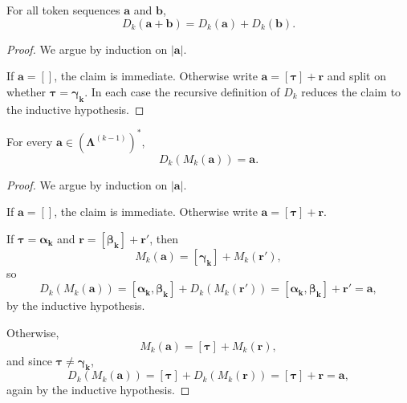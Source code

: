 \begin{lemma}
    \label{lemma:bpe-decompression-append}
    For all token sequences $\mathbf{a}$ and $\mathbf{b}$,
    \[
    D_k(\mathbf{a}+\mathbf{b}) = D_k(\mathbf{a}) + D_k(\mathbf{b}).
    \]
\end{lemma}
\begin{proof}
    We argue by induction on $|\mathbf{a}|$.

    If $\mathbf{a} = []$, the claim is immediate.
    Otherwise write $\mathbf{a} = [\boldsymbol{\tau}] + \mathbf{r}$ and split on whether
    $\boldsymbol{\tau} = \boldsymbol{\gamma_k}$.
    In each case the recursive definition of $D_k$ reduces the claim to the inductive hypothesis.
\end{proof}

\begin{lemma}
    \label{lemma:bpe-decompression-left-inverse}
    For every $\mathbf{a} \in (\boldsymbol{\Lambda}^{(k-1)})^*$,
    \[
    D_k(M_k(\mathbf{a})) = \mathbf{a}.
    \]
\end{lemma}
\begin{proof}
    We argue by induction on $|\mathbf{a}|$.

    If $\mathbf{a} = []$, the claim is immediate.
    Otherwise write $\mathbf{a} = [\boldsymbol{\tau}] + \mathbf{r}$.

    If $\boldsymbol{\tau} = \boldsymbol{\alpha_k}$ and $\mathbf{r} = [\boldsymbol{\beta_k}] + \mathbf{r}'$,
    then
    \[
    M_k(\mathbf{a}) = [\boldsymbol{\gamma_k}] + M_k(\mathbf{r}'),
    \]
    so
    \[
    D_k(M_k(\mathbf{a}))
    =
    [\boldsymbol{\alpha_k}, \boldsymbol{\beta_k}] + D_k(M_k(\mathbf{r}'))
    =
    [\boldsymbol{\alpha_k}, \boldsymbol{\beta_k}] + \mathbf{r}'
    =
    \mathbf{a},
    \]
    by the inductive hypothesis.

    Otherwise,
    \[
    M_k(\mathbf{a}) = [\boldsymbol{\tau}] + M_k(\mathbf{r}),
    \]
    and since $\boldsymbol{\tau} \neq \boldsymbol{\gamma_k}$,
    \[
    D_k(M_k(\mathbf{a}))
    =
    [\boldsymbol{\tau}] + D_k(M_k(\mathbf{r}))
    =
    [\boldsymbol{\tau}] + \mathbf{r}
    =
    \mathbf{a},
    \]
    again by the inductive hypothesis.
\end{proof}

